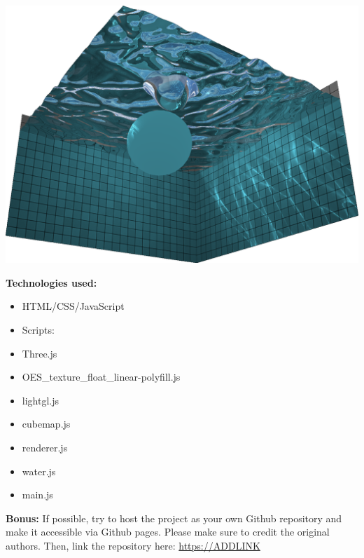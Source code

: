 \documentclass[10pt,oneside,onecolumn,letterpaper]{article}
\begin{document}
\noindent\includegraphics[width=\textwidth]{gfx/screenshot-madebyevan_webgl_water.png}

\break

\noindent\textbf{Technologies used:}

\begin{itemize}
    \item HTML/CSS/JavaScript
    \item Scripts:
    \item Three.js
    \item OES\_texture\_float\_linear-polyfill.js
    \item lightgl.js
    \item cubemap.js
    \item renderer.js
    \item water.js
    \item main.js
\end{itemize}

\noindent\textbf{Bonus:} If possible, try to host the project as your own Github repository and make it accessible via Github pages. Please make sure to credit the original authors. Then, link the repository here: \url{https://ADDLINK}
\end{document}
